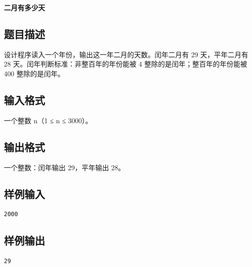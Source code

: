 \documentclass{article}
\newcommand{\problemname}[1]{\begin{center}\Large\bfseries #1\end{center}}
\begin{document}
\problemname{二月有多少天}

\subsection*{题目描述}
设计程序读入一个年份，输出这一年二月的天数。闰年二月有 29 天，平年二月有 28 天。闰年判断标准：非整百年的年份能被 4 整除的是闰年；整百年的年份能被 400 整除的是闰年。

\subsection*{输入格式}
一个整数 n（1 ≤ n ≤ 3000）。

\subsection*{输出格式}
一个整数：闰年输出 29，平年输出 28。

\subsection*{样例输入}
\begin{verbatim}
2000
\end{verbatim}

\subsection*{样例输出}
\begin{verbatim}
29
\end{verbatim}
\end{document}
